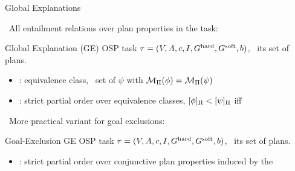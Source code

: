 \begin{frame}{Global Explanations}

%
\notesym~All entailment relations over plan properties in the task:

\begin{mydef}{Global Explanation (GE)}
%
OSP task $\tau =
(V,\allowbreak A,\allowbreak{\ensuremath{c}},\allowbreak I,\allowbreak G^{\text{\textup{hard}}},\allowbreak G^{\text{\textup{soft}}},\allowbreak{\ensuremath{b}})$, \plans\
its set of plans.
\begin{itemize}
\item {}: equivalence class, \ie\ set of $\psi$ with 
${\cal M}_{\Pi}(\phi) = {\cal M}_{\Pi}(\psi)$
\item {}: strict partial order
over equivalence classes, $[\phi]_{\Pi}
< [\psi]_{\Pi}$ iff 
\end{itemize}
%
%
\end{mydef}

\medskip \pause

%
\notesym~More practical variant for goal exclusions:

\begin{mydef}{Goal-Exclusion GE}
%
OSP task $\tau =
(V,\allowbreak A,\allowbreak{\ensuremath{c}},\allowbreak I,\allowbreak G^{\text{\textup{hard}}},\allowbreak G^{\text{\textup{soft}}},\allowbreak{\ensuremath{b}})$, \plans\
its set of plans.
\begin{itemize}
\item {}: strict partial 
order over conjunctive plan properties induced by
the 
\end{itemize}
%
%
\end{mydef}

\medskip

\end{frame}


